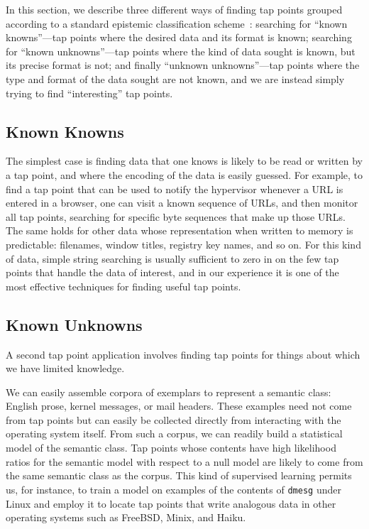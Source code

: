 In this section, we describe three different ways of finding tap points
grouped according to a standard epistemic classification
scheme~\cite{Rumsfeld:2002}: searching for ``known knowns''---tap points
where the desired data and its format is known; searching for ``known
unknowns''---tap points where the kind of data sought is known, but its
precise format is not; and finally ``unknown unknowns''---tap points
where the type and format of the data sought are not known, and we are
instead simply trying to find ``interesting'' tap points.

\subsection{Known Knowns}

The simplest case is finding data that one knows is likely to be read or
written by a tap point, and where the encoding of the data is easily
guessed. For example, to find a tap point that can be used to notify
the hypervisor whenever a URL is entered in a browser, one can visit a
known sequence of URLs, and then monitor all tap points, searching for
specific byte sequences that make up those URLs. The same holds for
other data whose representation when written to memory is predictable:
filenames, window titles, registry key names, and so on. For this kind
of data, simple string searching is usually sufficient to zero in on the
few tap points that handle the data of interest, and in our experience
it is one of the most effective techniques for finding useful tap
points.

\subsection{Known Unknowns}
\label{sec:technical:subsec:knownunk}

A second tap point application involves finding tap points for things
about which we have limited knowledge.

We can easily assemble corpora of exemplars to represent a semantic
class: English prose, kernel messages, or mail headers. These examples
need not come from tap points but can easily be collected directly from
interacting with the operating system itself. From such a corpus, we can
readily build a statistical model of the semantic class. Tap points
whose contents have high likelihood ratios for the semantic model with
respect to a null model are likely to come from the same semantic class
as the corpus. This kind of supervised learning permits us, for
instance, to train a model on examples of the contents of \texttt{dmesg}
under Linux and employ it to locate tap points that write analogous data
in other operating systems such as FreeBSD, Minix, and Haiku.

